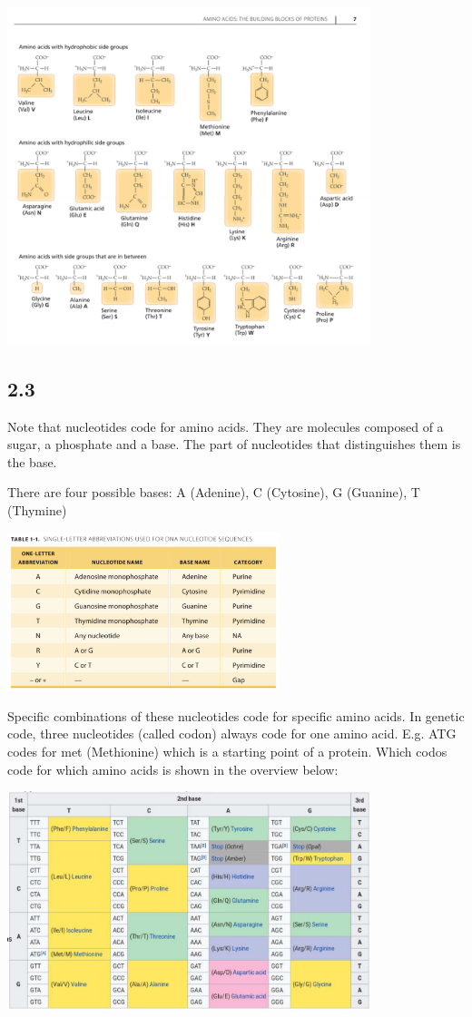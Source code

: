 \documentclass[]{article}
\begin{document}
\includegraphics[width=400px]{images/2.2_amino-acids}

\subsection{2.3}\label{section-2}

Note that nucleotides code for amino acids. They are molecules composed
of a sugar, a phosphate and a base. The part of nucleotides that
distinguishes them is the base.

There are four possible bases: A (Adenine), C (Cytosine), G (Guanine), T
(Thymine)

\includegraphics[width=300px]{images/2.3_nucleotides}

Specific combinations of these nucleotides code for specific amino
acids. In genetic code, three nucleotides (called codon) always code for
one amino acid. E.g. ATG codes for met (Methionine) which is a starting
point of a protein. Which codos code for which amino acids is shown in
the overview below:

\includegraphics[width=400px]{images/2.3_codons-aminoacids}
\end{document}
